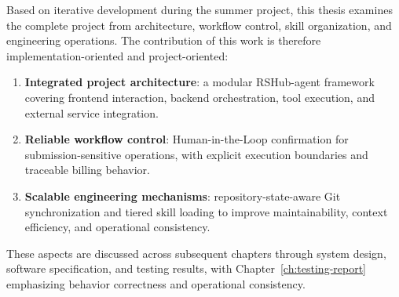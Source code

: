 {Based on iterative development during the summer project, this thesis examines the complete project from architecture, workflow control, skill organization, and engineering operations. The contribution of this work is therefore implementation-oriented and project-oriented:
\begin{enumerate}
	\item \textbf{Integrated project architecture}: a modular RSHub-agent framework covering frontend interaction, backend orchestration, tool execution, and external service integration.
	\item \textbf{Reliable workflow control}: Human-in-the-Loop confirmation for submission-sensitive operations, with explicit execution boundaries and traceable billing behavior.
	\item \textbf{Scalable engineering mechanisms}: repository-state-aware Git synchronization and tiered skill loading to improve maintainability, context efficiency, and operational consistency.
\end{enumerate}

These aspects are discussed across subsequent chapters through system design, software specification, and testing results, with Chapter~\ref{ch:testing-report} emphasizing behavior correctness and operational consistency.
	
}